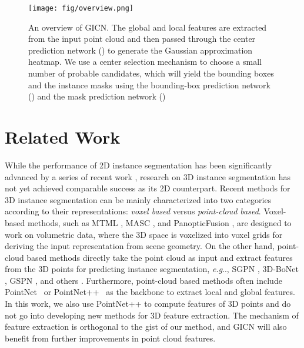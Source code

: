 \documentclass[runningheads]{llncs}
\makeatletter
\DeclareRobustCommand\onedot{\futurelet\@let@token\@onedot}
\def\@onedot{\ifx\@let@token.\else.\null\fi\xspace}
\def\eg{\emph{e.g}\onedot} \def\Eg{\emph{E.g}\onedot}
\makeatother
\begin{document}
\begin{figure*}[tb]
\begin{center}
 \texttt{[image: fig/overview.png]}
\end{center}
\vspace{-5mm}
   \caption{An overview of GICN. The global and local features are extracted from the input point cloud and then passed through the center prediction network (\raisebox{.5pt}{\textcircled{\raisebox{-.9pt} {1}}}) to generate the Gaussian approximation heatmap. We use a center selection mechanism to choose a small number of probable candidates, which will yield the bounding boxes and the instance masks using 
the bounding-box prediction network (\raisebox{.5pt}{\textcircled{\raisebox{-.8pt} {2}}}) and the mask prediction network (\raisebox{.5pt}{\textcircled{\raisebox{-.9pt} {3}}})}
\label{fig:model_overview}
\end{figure*}


\section{Related Work}
While the performance of 2D instance segmentation has been significantly advanced by a series of recent work \cite{AhnCK19,BaiU17,ChenHPS0A18,GaoSWZUUH19,HeGDG17,LiQDJW17,LiuJFU17,LiuQQSJ18,LiuYLZXLL18}, research on 3D instance segmentation has not yet achieved comparable success as its 2D counterpart. 
Recent methods for 3D instance segmentation can be mainly characterized into two categories according to their representations: {\em voxel based} versus {\em point-cloud based}. Voxel-based methods, such as MTML \cite{LahoudGPO19}, MASC \cite{LiuF19}, and PanopticFusion \cite{NaritaSIK19}, are designed to work on volumetric data, where the 3D space is voxelized into voxel grids for deriving the input representation from scene geometry.
On the other hand, point-cloud based methods directly take the point cloud as input and extract features from the 3D points for predicting instance segmentation, \eg, SGPN \cite{WangYHN18}, 3D-BoNet \cite{YangWCHWMT19}, GSPN \cite{YiZWSG19}, and others \cite{AraseMH19,ElichEKL19,PhamNHRY19,WangLSSJ19}.
Furthermore, point-cloud based methods often include PointNet~\cite{QiSMG17} or PointNet++~\cite{QiYSG17} as the backbone to extract local and global features. In this work, we also use PointNet++ to compute features of 3D points and do not go into developing new methods for 3D feature extraction. The mechanism of feature extraction is orthogonal to the gist of our method, and GICN will also benefit from further improvements in point cloud features.
\end{document}
